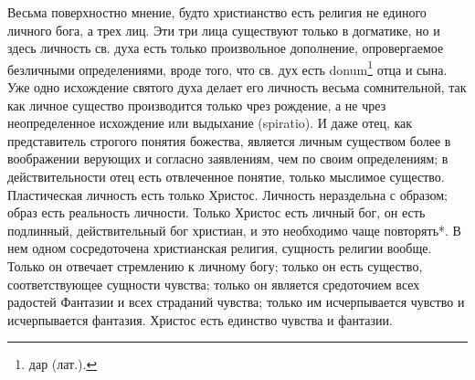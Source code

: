 \documentclass[12pt,oneside]{book}
\begin{document}
Весьма поверхностно мнение, будто христианство есть религия не единого личного бога, а трех лиц. Эти три лица существуют только в догматике, но и здесь личность св. духа есть только произвольное дополнение, опровергаемое безличными определениями, вроде того, что св. дух есть donum\footnote{дар (лат.).} отца и сына\ddag\let\svthefootnote\thefootnote\let\thefootnote\relax{}\let\thefootnote\svthefootnote. Уже одно исхождение святого духа делает его личность весьма сомнительной, так как личное существо производится только чрез рождение, а не чрез неопределенное исхождение или выдыхание (spiratio). И даже отец, как представитель строгого понятия божества, является личным существом более в воображении верующих и согласно заявлениям, чем по своим определениям; в действительности отец есть отвлеченное понятие, только мыслимое существо. Пластическая личность есть только Христос. Личность нераздельна с образом; образ есть реальность личности. Только Христос есть личный бог, он есть подлинный, действительный бог христиан, и это необходимо чаще повторять*\let\svthefootnote\thefootnote\let\thefootnote\relax{}\let\thefootnote\svthefootnote{}. В нем одном сосредоточена христианская религия, сущность религии вообще. Только он отвечает стремлению к личному богу; только он есть существо, соответствующее сущности чувства; только он является средоточием всех радостей Фантазии и всех страданий чувства; только им исчерпывается чувство и исчерпывается фантазия. Христос есть единство чувства и фантазии.
\end{document}
